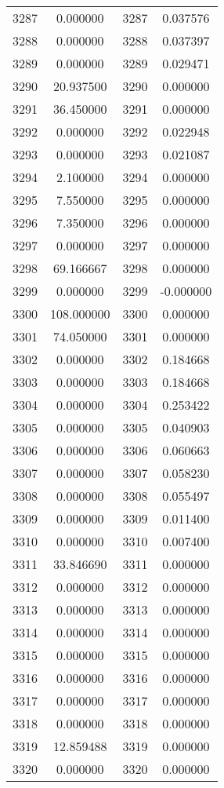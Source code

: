 \documentclass[12pt]{article}
\begin{document}
\begin{longtable}{@{}cccc@{}}
3287 & 0.000000 & 3287 & 0.037576 \\
3288 & 0.000000 & 3288 & 0.037397 \\
3289 & 0.000000 & 3289 & 0.029471 \\
3290 & 20.937500 & 3290 & 0.000000 \\
3291 & 36.450000 & 3291 & 0.000000 \\
3292 & 0.000000 & 3292 & 0.022948 \\
3293 & 0.000000 & 3293 & 0.021087 \\
3294 & 2.100000 & 3294 & 0.000000 \\
3295 & 7.550000 & 3295 & 0.000000 \\
3296 & 7.350000 & 3296 & 0.000000 \\
3297 & 0.000000 & 3297 & 0.000000 \\
3298 & 69.166667 & 3298 & 0.000000 \\
3299 & 0.000000 & 3299 & -0.000000 \\
3300 & 108.000000 & 3300 & 0.000000 \\
3301 & 74.050000 & 3301 & 0.000000 \\
3302 & 0.000000 & 3302 & 0.184668 \\
3303 & 0.000000 & 3303 & 0.184668 \\
3304 & 0.000000 & 3304 & 0.253422 \\
3305 & 0.000000 & 3305 & 0.040903 \\
3306 & 0.000000 & 3306 & 0.060663 \\
3307 & 0.000000 & 3307 & 0.058230 \\
3308 & 0.000000 & 3308 & 0.055497 \\
3309 & 0.000000 & 3309 & 0.011400 \\
3310 & 0.000000 & 3310 & 0.007400 \\
3311 & 33.846690 & 3311 & 0.000000 \\
3312 & 0.000000 & 3312 & 0.000000 \\
3313 & 0.000000 & 3313 & 0.000000 \\
3314 & 0.000000 & 3314 & 0.000000 \\
3315 & 0.000000 & 3315 & 0.000000 \\
3316 & 0.000000 & 3316 & 0.000000 \\
3317 & 0.000000 & 3317 & 0.000000 \\
3318 & 0.000000 & 3318 & 0.000000 \\
3319 & 12.859488 & 3319 & 0.000000 \\
3320 & 0.000000 & 3320 & 0.000000 \\

\end{longtable}
\end{document}
